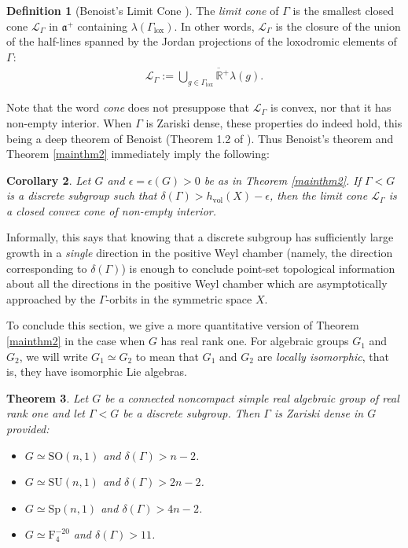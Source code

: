 \documentclass[psamsfonts]{amsart}
\newtheorem{thm}{Theorem}[section]
\newtheorem{cor}[thm]{Corollary}
\theoremstyle{definition}
\newtheorem{defn}[thm]{Definition}
\theoremstyle{remark}
\numberwithin{equation}{section}
\begin{document}
\begin{defn} [Benoist's Limit Cone \cite{Ben}]
\label{limitcone}
The \emph{limit cone} of $\Gamma$ is the smallest closed cone $\mathcal{L}_{\Gamma}$ in $\mathfrak{a}^{+}$ containing $\lambda(\Gamma_{\mathrm{lox}})$. In other words, $\mathcal{L}_{\Gamma}$ is the closure of the union of the half-lines spanned by the Jordan projections of the loxodromic elements of $\Gamma$:
\begin{align*}
\mathcal{L}_{\Gamma} := \overline{\bigcup_{g \in \Gamma_{\mathrm{lox}}} \mathbb{R}^{+} \lambda(g)}.
\end{align*}
\end{defn} Note that the word \emph{cone} does not presuppose that $\mathcal{L}_{\Gamma}$ is convex, nor that it has non-empty interior. When $\Gamma$ is Zariski dense, these properties do indeed hold, this being a deep theorem of Benoist (Theorem 1.2 of \cite{Ben}). Thus Benoist's theorem and Theorem \ref{mainthm2} immediately imply the following:
\begin{cor}
\label{limitconecor}
Let $G$ and $\epsilon = \epsilon(G) > 0$ be as in Theorem \ref{mainthm2}. If $\Gamma < G$ is a discrete subgroup such that $\delta(\Gamma) > h_{\mathrm{vol}}(X) - \epsilon$, then the limit cone $\mathcal{L}_{\Gamma}$ is a closed convex cone of non-empty interior.
\end{cor}
Informally, this says that knowing that a discrete subgroup has sufficiently large growth in a \emph{single} direction in the positive Weyl chamber (namely, the direction corresponding to $\delta(\Gamma)$) is enough to conclude point-set topological information about all the directions in the positive Weyl chamber which are asymptotically approached by the $\Gamma$-orbits in the symmetric space $X$.
\par 
To conclude this section, we give a more quantitative version of Theorem \ref{mainthm2} in the case when $G$ has real rank one. For algebraic groups $G_{1}$ and $G_{2}$, we will write $G_{1} \simeq G_{2}$ to mean that $G_{1}$ and $G_{2}$ are \emph{locally isomorphic}, that is, they have isomorphic Lie algebras. 
\begin{thm}
\label{realrankoneversion}
Let $G$ be a connected noncompact simple real algebraic group of real rank one and let $\Gamma < G$ be a discrete subgroup. Then $\Gamma$ is Zariski dense in $G$ provided:
\begin{itemize}
    \item[(a)] $G \simeq \mathrm{SO}(n,1)$ and $\delta(\Gamma) > n-2$.
    \item[(b)] $G \simeq \mathrm{SU}(n,1)$ and $\delta(\Gamma) > 2n-2$.
    \item[(c)] $G \simeq \mathrm{Sp}(n,1)$ and $\delta(\Gamma) > 4n-2$.
    \item[(d)] $G \simeq \mathrm{F}_{4}^{-20}$ and $\delta(\Gamma) > 11$.
\end{itemize}
\end{thm}
\end{document}
